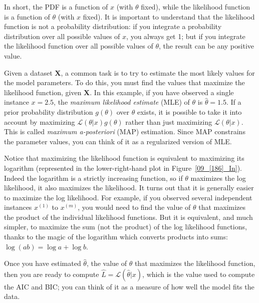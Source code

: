 In short, the PDF is a function of $x$ (with $\theta$ fixed), while the likelihood function is a function of $\theta$ (with $x$ fixed). It is important to understand that the likelihood function is not a probability distribution: if you integrate a probability distribution over all possible values of $x$, you always get 1; but if you integrate the likelihood function over all possible values of $\theta$, the result can be any positive value.

Given a dataset $\mathbf{X}$, a common task is to try to estimate the most likely values for the model parameters. To do this, you must find the values that maximize the likelihood function, given $\mathbf{X}$. In this example, if you have observed a single instance $x=2.5$, the \emph{maximum likelihood estimate} (MLE) of $\theta$ is $\widehat{\theta}=1.5$. If a prior probability distribution $g(\theta)$ over $\theta$ exists, it is possible to take it into account by maximizing $\mathcal{L}(\theta|x)g(\theta)$ rather than just maximizing $\mathcal{L}(\theta|x)$. This is called \emph{maximum a-posteriori} (MAP) estimation. Since MAP constrains the parameter values, you can think of it as a regularized version of MLE.

Notice that maximizing the likelihood function is equivalent to maximizing its logarithm (represented in the lower-right-hand plot in Figure~\ref{09_[186]_In}). Indeed the logarithm is a strictly increasing function, so if $\theta$ maximizes the log likelihood, it also maximizes the likelihood. It turns out that it is generally easier to maximize the log likelihood. For example, if you observed several independent instances $x^{(1)}$ to $x^{(m)}$, you would need to find the value of $\theta$ that maximizes the product of the individual likelihood functions. But it is equivalent, and much simpler, to maximize the sum (not the product) of the log likelihood functions, thanks to the magic of the logarithm which converts products into sums: $\log{(ab)}=\log{a}+\log{b}$.

Once you have estimated $\widehat{\theta}$, the value of $\theta$ that maximizes the likelihood function, then you are ready to compute $\widehat{L}=\mathcal{L}(\widehat{\theta}|x)$, which is the value used to compute the AIC and BIC; you can think of it as a measure of how well the model fits the data.

